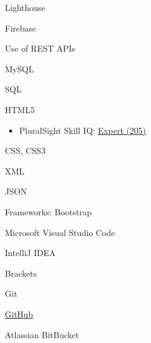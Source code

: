 \documentclass[]{deedy-resume-openfont}
\begin{document}
\descript{}
\begin{tightemize}
\item Lighthouse
\end{tightemize}
\sectionsep

\descript{}
\begin{tightemize}
\item Firebase
\item Use of REST APIs
\end{tightemize}
\sectionsep

\descript{}
\begin{tightemize}
\item MySQL\footnotemark[\value{footnote}]
\item SQL
\end{tightemize}
\sectionsep

\descript{}
\begin{tightemize}
\item HTML5\footnotemark[\value{footnote}]
\begin{itemize}
\item PluralSight Skill IQ: \href{https://app.pluralsight.com/profile/alexander-koik-cesto}{\underline{Expert (205)}}
\end{itemize}
\item CSS\footnotemark[\value{footnote}], CSS3
\item XML
\item JSON\footnotemark[\value{footnote}]
\item Frameworks: Bootstrap
\end{tightemize}
\sectionsep

\descript{}
\begin{tightemize}
\item Microsoft Visual Studio Code
\item IntelliJ IDEA
\item Brackets
\end{tightemize}
\sectionsep

\descript{}
\begin{tightemize}
\item Git
\item \href{https://github.com/sirkoik}{\underline{GitHub}}
\item Atlassian BitBucket
\end{tightemize}
\sectionsep
\end{document}
